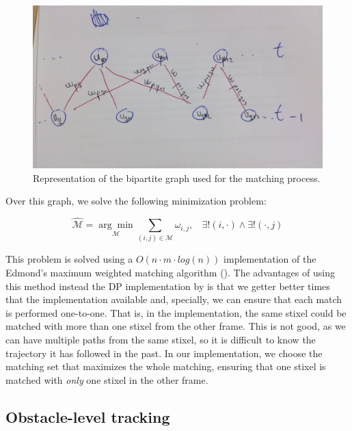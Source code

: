 \begin{figure}[h!]
\centering
\includegraphics[width=\textwidth]{bipartite_graph}
\caption{Representation of the bipartite graph used for the matching process.}\label{fig:cp04_bipartite_graph}
\end{figure}

Over this graph, we solve the following minimization problem:

\begin{equation}\label{eq:cp04_match_minimization}
\mathcal{\hat{M}}=\underset{\mathcal{M}}{\arg\min} \underset{(i, j) \in \mathcal{M}}{\sum} \omega_{i,j}, 
~~~~\exists! (i, \cdot) \wedge \exists! (\cdot, j)
\end{equation}

This problem is solved using a $O(n \cdot m \cdot log(n))$ implementation of the Edmond's maximum weighted matching algorithm (\cite{edmonds1965paths}). The advantages of using this method instead the \ac{DP} implementation by \cite{gunyel2012stixels} is that we getter better times that the implementation available and, specially, we can ensure that each match is performed one-to-one. That is, in the \cite{gunyel2012stixels} implementation, the same stixel could be matched with more than one stixel from the other frame. This is not good, as we can have multiple paths from the same stixel, so it is difficult to know the trajectory it has followed in the past. In our implementation, we choose the matching set that maximizes the whole matching, ensuring that one stixel is matched with \emph{only} one stixel in the other frame.

\subsection{Obstacle-level tracking}\label{ch:chapter04_01_04}

